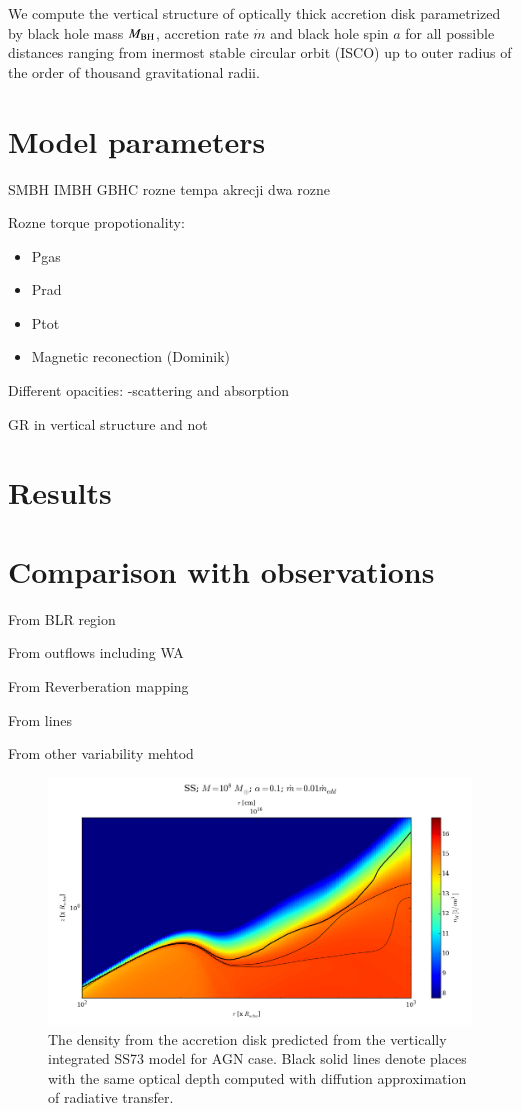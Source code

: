 \documentclass[preprint2]{aastex6}
\begin{document}
We compute the vertical structure of optically thick accretion disk parametrized by black hole 
mass $M_{\rm BH}$, accretion rate $\dot m$ and black hole spin $a$ for all possible distances
ranging from inermost stable circular orbit (ISCO) up to outer radius of the order of thousand 
gravitational radii.   

\section{Model parameters}
\label{sec:param}

SMBH
IMBH
GBHC
rozne tempa akrecji dwa rozne 

Rozne torque propotionality:
\begin{itemize}
\item Pgas
\item Prad
\item Ptot 
\item Magnetic reconection (Dominik)
\end{itemize}

Different opacities:
-scattering and absorption 

GR in vertical structure and not 

\section{Results}


\section{Comparison with observations}
\label{sec:source}

From BLR region 

From outflows including WA 

From Reverberation mapping 

From lines 

From other variability mehtod 




\begin{figure}
 \includegraphics[scale=0.62]{plot_ss_r100.png}
 \caption{The density from the accretion disk predicted from the vertically integrated SS73 model for AGN case.  
 Black solid lines denote places with the same optical depth computed with diffution approximation of radiative transfer.}
 \label{fig:counts*}
\end{figure}
\end{document}
